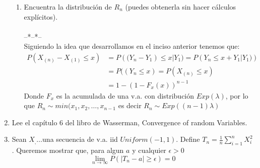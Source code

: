 \documentclass[letter]{memoir} %
\begin{document}
\begin{enumerate}
\begin{enumerate}
\item Encuentra la distribución de $R_n$ (puedes obtenerla sin hacer cálculos explícitos).\\\\
--*--*--\\
Siguiendo la idea que desarrollamos en el inciso anterior tenemos que:
\begin{equation*}
\begin{split}
P(X_{(n)} - X_{(1)} \leq x) & = P\left( ( Y_n -Y_1\right) \leq x|Y_1) = P\left(  Y_n  \leq x +Y_1|Y_1)\right) \\
& = P(\left(  Y_n  \leq x \right) = P(X_{(n)} \leq x) \\
& = 1-(1-F_x(x))^{n-1}
\end{split}
\end{equation*}
Donde $F_x$ es la acumulada de una v.a. con distribución $Exp(\lambda)$, por lo que $R_{n}\sim min(x_1,x_2,\dots, x_{n-1}$
es decir $R_{n}\sim Exp((n-1)\lambda)$
\end{enumerate}

\item Lee el capítulo 6 del libro de Wasserman, Convergence of random Variables.
\item Sean $X_, \dots $una secuencia de v.a. iid $Uniform(-1, 1)$. Define $T_n = \frac{1}{n}\sum_{i=1}^n X_i^2$. Queremos mostrar que, para algun $a$ y cualquier $\epsilon > 0$ \\
\begin{equation}\label{convergencia_pro}
	\lim_{n\rightarrow \infty	} P(|T_n - a| \geq \epsilon) = 0
\end{equation}


\end{enumerate}
\end{document}
